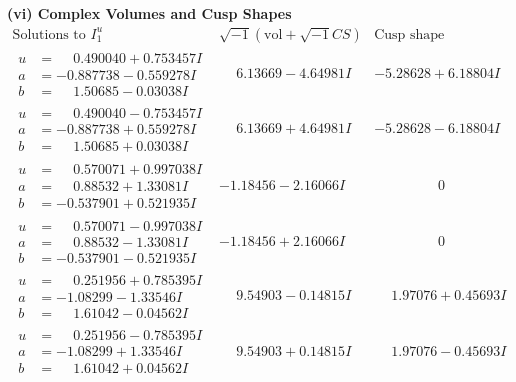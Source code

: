 \documentclass[1p]{elsarticle_modified}
\theoremstyle{definition}
\newcommand{\I}{\sqrt{-1}}
\begin{document}
\newpage\flushleft \textbf{(vi) Complex Volumes and Cusp Shapes}
$$\begin{array}{c|c|c}  
\text{Solutions to }I^u_{1}& \I (\text{vol} + \sqrt{-1}CS) & \text{Cusp shape}\\
 \hline 
\begin{aligned}
u &= \phantom{-}0.490040 + 0.753457 I \\
a &= -0.887738 - 0.559278 I \\
b &= \phantom{-}1.50685 - 0.03038 I\end{aligned}
 & \phantom{-}6.13669 - 4.64981 I & -5.28628 + 6.18804 I \\ \hline\begin{aligned}
u &= \phantom{-}0.490040 - 0.753457 I \\
a &= -0.887738 + 0.559278 I \\
b &= \phantom{-}1.50685 + 0.03038 I\end{aligned}
 & \phantom{-}6.13669 + 4.64981 I & -5.28628 - 6.18804 I \\ \hline\begin{aligned}
u &= \phantom{-}0.570071 + 0.997038 I \\
a &= \phantom{-}0.88532 + 1.33081 I \\
b &= -0.537901 + 0.521935 I\end{aligned}
 & -1.18456 - 2.16066 I & \phantom{-0.000000 } 0 \\ \hline\begin{aligned}
u &= \phantom{-}0.570071 - 0.997038 I \\
a &= \phantom{-}0.88532 - 1.33081 I \\
b &= -0.537901 - 0.521935 I\end{aligned}
 & -1.18456 + 2.16066 I & \phantom{-0.000000 } 0 \\ \hline\begin{aligned}
u &= \phantom{-}0.251956 + 0.785395 I \\
a &= -1.08299 - 1.33546 I \\
b &= \phantom{-}1.61042 - 0.04562 I\end{aligned}
 & \phantom{-}9.54903 - 0.14815 I & \phantom{-}1.97076 + 0.45693 I \\ \hline\begin{aligned}
u &= \phantom{-}0.251956 - 0.785395 I \\
a &= -1.08299 + 1.33546 I \\
b &= \phantom{-}1.61042 + 0.04562 I\end{aligned}
 & \phantom{-}9.54903 + 0.14815 I & \phantom{-}1.97076 - 0.45693 I \\ \hline\begin{aligned}

\end{aligned}
\end{array}$$
\end{document}
